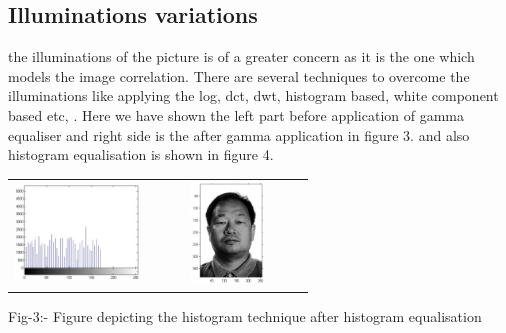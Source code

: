 \documentclass[final,3p,times,twocolumn,sort&compress]{elsarticle}
\begin{document}
\subsection{Illuminations variations}
\hspace{1cm} the illuminations of the picture is of a greater concern as it is the one which models the image correlation. There are several techniques to overcome the illuminations like applying the log, dct, dwt, histogram based, white component based etc,\cite{two} . Here we have shown the left part before application of gamma equaliser and right side is the after gamma application in figure 3. and also histogram equalisation is shown in figure 4.
\begin{table}[htbp]
  \begin{center}
  \begin{tabular}{cc}
    \includegraphics[width=3.3cm,height=2.7cm]{illu2} &  \includegraphics[width=3.9cm,height=2.7cm]{illu1} \\
     \end{tabular}
Fig-3:- Figure depicting the histogram technique after histogram equalisation
 \end{center}
 \end{table}
\end{document}

